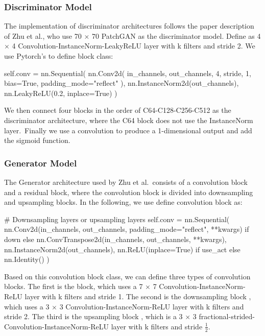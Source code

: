 \subsubsection{Discriminator Model}
The implementation of discriminator architectures follows the paper description of Zhu et al., who use 70 $\times$ 70 PatchGAN as the discriminator model. Define  as 4 $\times$ 4 Convolution-InstanceNorm-LeakyReLU layer with k filters and stride 2. We use Pytorch's  to define  block class:

\begin{python}
self.conv = nn.Sequential(
    nn.Conv2d(
        in_channels, 
        out_channels,
        4, 
        stride, 
        1, 
        bias=True,
        padding_mode="reflect"
    ),
    nn.InstanceNorm2d(out_channels),
    nn.LeakyReLU(0.2, inplace=True)
)
\end{python}

We then connect four  blocks in the order of C64-C128-C256-C512 as the discriminator architecture, where the C64 block does not use the InstanceNorm layer.\ Finally we use a convolution to produce a 1-dimensional output and add the sigmoid function.

\subsubsection{Generator Model}
The Generator architecture used by Zhu et al.\  consists of a convolution block and a residual block, where the convolution block is divided into downsampling and upsampling blocks. In the following, we use  define convolution block as:

\begin{python}
# Downsampling layers or upsampling layers
self.conv = nn.Sequential(
    nn.Conv2d(in_channels, 
              out_channels, 
              padding_mode="reflect", 
              **kwargs) 
              if down
              else 
              nn.ConvTranspose2d(in_channels,
                                 out_channels, 
                                 **kwargs),
    nn.InstanceNorm2d(out_channels),
    nn.ReLU(inplace=True) if use_act else nn.Identity()
)
\end{python}

Based on this convolution block class, we can define three types of convolution blocks. The first is the  block, which uses a 7 $\times$ 7 Convolution-InstanceNorm-ReLU layer with k filters and stride 1. The second is the downsampling block , which uses a 3 $\times$ 3 Convolution-InstanceNorm-ReLU layer with k filters and stride 2. The third is the upsampling block , which is a 3 $\times$ 3 fractional-strided-Convolution-InstanceNorm-ReLU layer with k filters and stride $\frac{1}{2}$.

